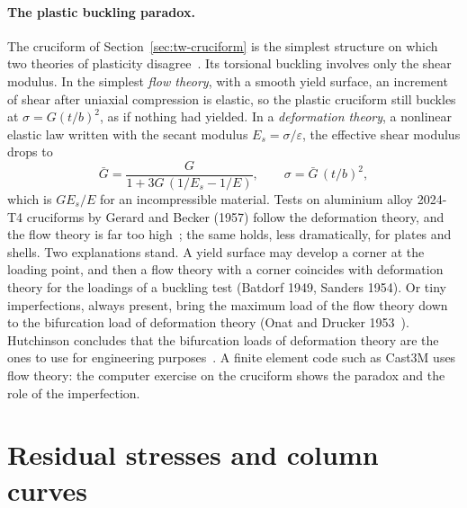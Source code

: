 \paragraph{The plastic buckling paradox.}
%
The cruciform of Section~\ref{sec:tw-cruciform} is the simplest structure on which two theories of
plasticity disagree~\cite[pp.~99--101]{tw-hutchinson1974}. Its torsional buckling involves only
the shear modulus. In the simplest \emph{flow theory}, with a smooth yield surface, an increment of
shear after uniaxial compression is elastic, so the plastic cruciform still buckles at
$\sigma = G(t/b)^2$, as if nothing had yielded. In a \emph{deformation theory}, a nonlinear elastic law
written with the secant modulus $E_s = \sigma/\varepsilon$, the effective shear modulus drops to
\begin{equation}\label{eq:tw-gdef}
  \bar G = \frac{G}{1 + 3G\,(1/E_s - 1/E)} ,
  \qquad
  \sigma = \bar G\,(t/b)^2 ,
\end{equation}
which is $GE_s/E$ for an incompressible material. Tests on aluminium alloy 2024-T4 cruciforms by
Gerard and Becker (1957) follow the deformation theory, and the flow theory is far too
high~\cite{tw-gerard1957}; the same holds, less dramatically, for plates and shells. Two
explanations stand. A yield surface may develop a corner at the loading point, and then a flow
theory with a corner coincides with deformation theory for the loadings of a buckling test (Batdorf
1949, Sanders 1954). Or tiny imperfections, always present, bring the maximum load of the
flow theory down to the bifurcation load of deformation theory (Onat and Drucker
1953~\cite{tw-onat1953}). Hutchinson concludes that the bifurcation loads of deformation theory are the ones to use for
engineering purposes~\cite[p.~101]{tw-hutchinson1974}. A finite element code such as Cast3M uses flow theory: the computer exercise on
the cruciform shows the paradox and the role of the imperfection.

\section{Residual stresses and column curves}\label{sec:tw-curves}
%

